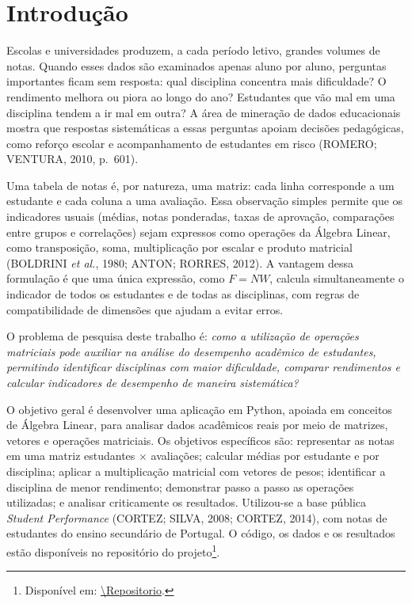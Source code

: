 \documentclass[12pt,a4paper]{article}
\begin{document}
\section{Introdução}

Escolas e universidades produzem, a cada período letivo, grandes volumes de notas. Quando esses dados são examinados apenas aluno por aluno, perguntas importantes ficam sem resposta: qual disciplina concentra mais dificuldade? O rendimento melhora ou piora ao longo do ano? Estudantes que vão mal em uma disciplina tendem a ir mal em outra? A área de mineração de dados educacionais mostra que respostas sistemáticas a essas perguntas apoiam decisões pedagógicas, como reforço escolar e acompanhamento de estudantes em risco (ROMERO; VENTURA, 2010, p.~601).

Uma tabela de notas é, por natureza, uma matriz: cada linha corresponde a um estudante e cada coluna a uma avaliação. Essa observação simples permite que os indicadores usuais (médias, notas ponderadas, taxas de aprovação, comparações entre grupos e correlações) sejam expressos como operações da Álgebra Linear, como transposição, soma, multiplicação por escalar e produto matricial (BOLDRINI \textit{et al.}, 1980; ANTON; RORRES, 2012). A vantagem dessa formulação é que uma única expressão, como $F=NW$, calcula simultaneamente o indicador de todos os estudantes e de todas as disciplinas, com regras de compatibilidade de dimensões que ajudam a evitar erros.

O problema de pesquisa deste trabalho é: \textit{como a utilização de operações matriciais pode auxiliar na análise do desempenho acadêmico de estudantes, permitindo identificar disciplinas com maior dificuldade, comparar rendimentos e calcular indicadores de desempenho de maneira sistemática?}

O objetivo geral é desenvolver uma aplicação em Python, apoiada em conceitos de Álgebra Linear, para analisar dados acadêmicos reais por meio de matrizes, vetores e operações matriciais. Os objetivos específicos são: representar as notas em uma matriz estudantes $\times$ avaliações; calcular médias por estudante e por disciplina; aplicar a multiplicação matricial com vetores de pesos; identificar a disciplina de menor rendimento; demonstrar passo a passo as operações utilizadas; e analisar criticamente os resultados. Utilizou-se a base pública \textit{Student Performance} (CORTEZ; SILVA, 2008; CORTEZ, 2014), com notas de estudantes do ensino secundário de Portugal. O código, os dados e os resultados estão disponíveis no repositório do projeto\footnote{Disponível em: \url{\Repositorio}.}.
\end{document}
